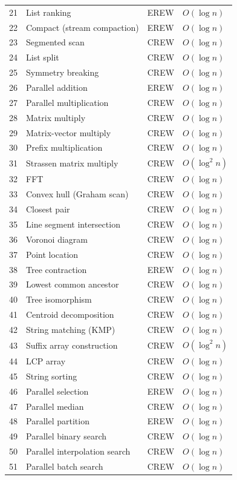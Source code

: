 \documentclass[11pt]{article}
\begin{document}
\begin{table}[p]
\begin{tabular}{@{}rlll@{}}
21 & List ranking & EREW & $O(\log n)$ \\
22 & Compact (stream compaction) & EREW & $O(\log n)$ \\
23 & Segmented scan & CREW & $O(\log n)$ \\
24 & List split & CREW & $O(\log n)$ \\
25 & Symmetry breaking & CREW & $O(\log n)$ \\
\midrule
26 & Parallel addition & EREW & $O(\log n)$ \\
27 & Parallel multiplication & CREW & $O(\log n)$ \\
28 & Matrix multiply & CREW & $O(\log n)$ \\
29 & Matrix-vector multiply & CREW & $O(\log n)$ \\
30 & Prefix multiplication & CREW & $O(\log n)$ \\
31 & Strassen matrix multiply & CREW & $O(\log^2 n)$ \\
32 & FFT & CREW & $O(\log n)$ \\
\midrule
33 & Convex hull (Graham scan) & CREW & $O(\log n)$ \\
34 & Closest pair & CREW & $O(\log n)$ \\
35 & Line segment intersection & CREW & $O(\log n)$ \\
36 & Voronoi diagram & CREW & $O(\log n)$ \\
37 & Point location & CREW & $O(\log n)$ \\
\midrule
38 & Tree contraction & EREW & $O(\log n)$ \\
39 & Lowest common ancestor & CREW & $O(\log n)$ \\
40 & Tree isomorphism & CREW & $O(\log n)$ \\
41 & Centroid decomposition & CREW & $O(\log n)$ \\
\midrule
42 & String matching (KMP) & CREW & $O(\log n)$ \\
43 & Suffix array construction & CREW & $O(\log^2 n)$ \\
44 & LCP array & CREW & $O(\log n)$ \\
45 & String sorting & CREW & $O(\log n)$ \\
\midrule
46 & Parallel selection & EREW & $O(\log n)$ \\
47 & Parallel median & CREW & $O(\log n)$ \\
48 & Parallel partition & EREW & $O(\log n)$ \\
\midrule
49 & Parallel binary search & CREW & $O(\log n)$ \\
50 & Parallel interpolation search & CREW & $O(\log n)$ \\
51 & Parallel batch search & CREW & $O(\log n)$ \\
\bottomrule
\end{tabular}
\end{table}
\end{document}
